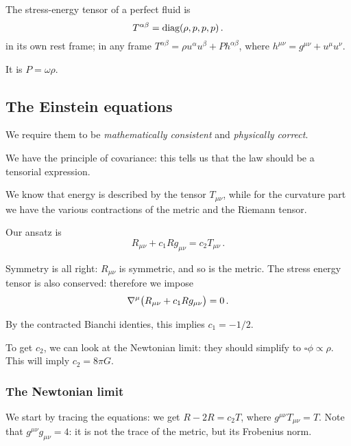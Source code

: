\documentclass[main.tex]{subfiles}
\begin{document}
\begin{claim}
The stress-energy tensor of a perfect fluid is 
%
\begin{equation}
  T^{\alpha \beta } = \text{diag}\qty(\rho , p, p, p )
\,.
\end{equation}
%
in its own rest frame; in any frame \(T^{\alpha \beta } = \rho u^{\alpha } u^{\beta } + P h^{\alpha \beta }\),  where \(h^{\mu \nu } = g^{ \mu \nu }+u^{\mu } u^{\nu }\).
\end{claim}

\begin{definition}
It is \(P = \omega \rho \).
\end{definition}

\subsection{The Einstein equations}

We require them to be \emph{mathematically consistent} and \emph{physically correct}.

We have the principle of covariance: this tells us that the law should be a tensorial expression.

We know that energy is described by the tensor \(T_{\mu \nu }\), while for the curvature part we have the various contractions of the metric and the Riemann tensor.

Our ansatz is 
%
\begin{equation}
  R_{\mu \nu } + c_1 R g_{\mu \nu } = c_2 T_{\mu \nu }
\,.
\end{equation}

Symmetry is all right: \(R_{\mu \nu }\) is symmetric, and so is the metric.
The stress energy tensor is also conserved: therefore we impose 
%
\begin{equation}
  \nabla^{\mu } \qty(R_{\mu \nu } + c_1 R g_{\mu \nu })= 0
\,.
\end{equation}

By the contracted Bianchi identies, this implies \(c_1 = -1/2\).

To get \(c_2 \), we can look at the Newtonian limit: they should simplify to \(\square \phi \propto \rho \). This will imply \(c_2 = 8 \pi G \).

\subsubsection{The Newtonian limit}

We start by tracing the equations: we get \(R-2R = c_2 T \), where \(g^{\mu \nu }T_{\mu \nu }= T\).
Note that \(g^{ \mu \nu }g_{ \mu \nu }=4\): it is not the trace of the metric, but its Frobenius norm.
\end{document}
